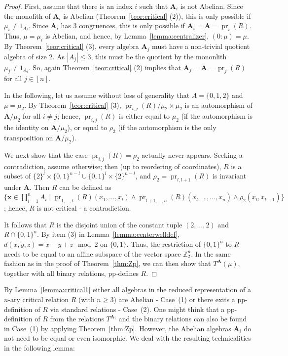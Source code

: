 \documentclass[12pt]{amsart}
\theoremstyle{definition}
\theoremstyle{definition}
\newcommand{\alg}[1]{\mathbf{#1}}
\newcommand{\algA}{\alg{A}}
\DeclareMathOperator{\pr}{pr}
\begin{document}
\begin{proof}
First, assume that there is an index $i$ such that $\alg{A}_i$ is not Abelian. Since the monolith of $\algA_i$ is Abelian (Theorem~\ref{teor:critical} (2)), this is only possible if $\mu_i \neq 1_{A_i}$. Since $\algA_i$ has 3 congruences, this is only possible if $\alg{A}_i = \alg{A} = \pr_i(R)$. Thus, $\mu = \mu_i$ is Abelian, and hence, by Lemma~\ref{lemma:centralizer}, $(0:\mu) = \mu$. By Theorem~\ref{teor:critical} (3), every algebra $\algA_j$ must have a non-trivial quotient algebra of size 2. As $|A_j| \leq 3$, this must be the quotient by the mononlith $\mu_j \neq 1_{A_i}$. So, again Theorem~\ref{teor:critical} (2) implies that $\alg{A}_j=\alg{A} = \pr_j(R)$ for all $j \in [n]$. 

In the following, let us assume without loss of generality that $A = \{0,1,2\}$ and $\mu = \mu_2$. By Theorem~\ref{teor:critical} (3), $\pr_{i,j}(R)/\mu_2 \times  \mu_2$ is an automorphism of $\alg{A}/\mu_2$ for all $i \neq j$; hence, $\pr_{i,j}(R)$ is either equal to $\mu_2$ (if the automorphism is the identity on $\alg{A}/\mu_2$), or equal to $\rho_2$ (if the automorphism is the only transposition on $\alg{A}/\mu_2$).

We next show that the case $\pr_{i,j}(R) = \rho_2$ actually never appears. Seeking a contradiction, assume otherwise; then (up to reordering of coordinates), $R$ is a subset of $\{2\}^l \times \{0,1\}^{n-l} \cup \{0,1\}^{l} \times \{2\}^{n-l}$, and $\rho_2 = \pr_{l,l+1}(R)$ is invariant under $\alg{A}$. Then $R$ can be defined as  $\{\boldsymbol{x} \in \prod_{i=1}^n A_i \mid \pr_{1,\ldots,l}(R)(x_1,\ldots,x_l) \land \pr_{l+1,\ldots,n}(R)(x_{l+1},\ldots,x_n) \land \rho_2(x_l,x_{l+1})\}$; hence, $R$ is not critical - a contradiction.

It follows that $R$ is the disjoint union of the constant tuple $(2,\ldots,2)$ and $R\cap \{0,1\}^n$. By item (3) in Lemma~\ref{lemma:centerwelldef}, $d(x,y,z) = x-y+z\mod 2$ on $\{0,1\}$. Thus, the restriction of $\{0,1\}^n$ to $R$ needs to be equal to an affine subspace of the vector space $\mathbb{Z}_2^n$. In the same fashion as in the proof of Theorem~\ref{thm:Zp}, we can then show that $T^\alg{A}(\mu)$, together with all binary relations, pp-defines $R$.
\end{proof}

By Lemma~\ref{lemma:critical1} either all algebras in the reduced representation of a $n$-ary critical relation $R$ (with $n\geq 3$) are Abelian - Case~(1) or there exits a pp-definition of $R$ via standard relations - Case~(2).
One might think that  a pp-definition of $R$ from the relations $T^{\algA_i}$ and the binary relations can also be found in Case~(1) by applying Theorem~\ref{thm:Zp}. 
However, the Abelian algebras $\algA_i$ do not need to be equal or even isomorphic. We deal with the resulting technicalities in the following lemma:
\end{document}
